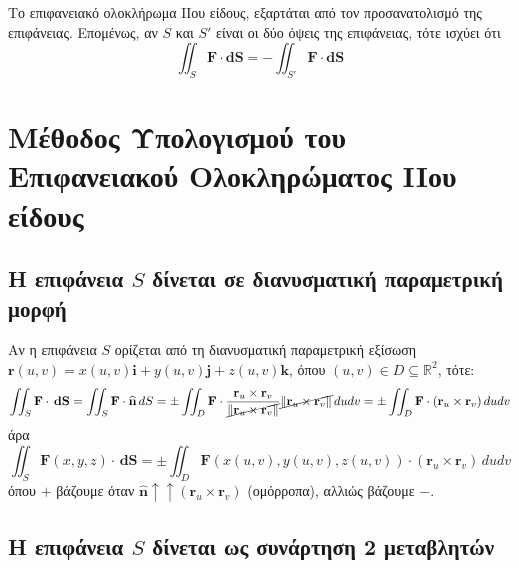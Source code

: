\documentclass[a4paper,table]{report}
\begin{document}
\begin{rem}
  Το επιφανειακό ολοκλήρωμα ΙΙου είδους, εξαρτάται από τον προσανατολισμό της επιφάνειας.
  Επομένως, αν $S$ και $ S' $ είναι οι δύο όψεις της επιφάνειας, τότε ισχύει ότι 
  \[
    \iint_{S} \mathbf{F} \cdot {\mathbf{dS}} = - \iint_{S'} \mathbf{F} \cdot
    {\mathbf{dS}} 
  \] 
\end{rem}



\section{Μέθοδος Υπολογισμού του Επιφανειακού Ολοκληρώματος IIου είδους}

\subsection*{Η επιφάνεια $S$ δίνεται σε διανυσματική παραμετρική μορφή}

Αν η επιφάνεια $S$ ορίζεται από τη διανυσματική παραμετρική εξίσωση 
$ \mathbf{r}(u,v) = x(u,v)\mathbf{i}+y(u,v)\mathbf{j}+z(u,v)\mathbf{k} $, όπου 
$ (u,v) \in D \subseteq \mathbb{R}^{2} $, τότε:
\[
  \iint_{S} \mathbf{F} \cdot \,{\mathbf{dS}} = \iint_{S} \mathbf{F} \cdot
  \mathbf{\widehat{n}}\,{dS} = \pm\iint_{D} \mathbf{F} \cdot \frac{\mathbf{r}_{u} \times
  \mathbf{r}_{v}}{\cancel{\norm{\mathbf{r}_{u} \times \mathbf{r}_{v}}}}
  \cancel{\norm{\mathbf{r}_{u} \times \mathbf{r}_{v}}}\,{du}{dv} = \pm\iint_{D} 
  \mathbf{F} \cdot (\mathbf{r}_{u} \times \mathbf{r}_{v}) \,{du}{dv}
\]
άρα
\begin{equation*}
  \boxed{\iint_{S} \mathbf{F}(x,y,z) \cdot \,{\mathbf{dS}} = \pm\iint_{D} 
    \mathbf{F}(x(u,v),y(u,v),z(u,v)) \cdot (\mathbf{r}_{u} \times \mathbf{r}_{v}) 
  \,{du}{dv}}
\end{equation*}
όπου $ + $ βάζουμε όταν $ \mathbf{\widehat{n}} \uparrow\uparrow (\mathbf{r}_{u} \times
\mathbf{r}_{v}) $ (ομόρροπα), αλλιώς βάζουμε $ - $.

\subsection*{Η επιφάνεια $S$ δίνεται ως συνάρτηση 2 μεταβλητών}
\end{document}
